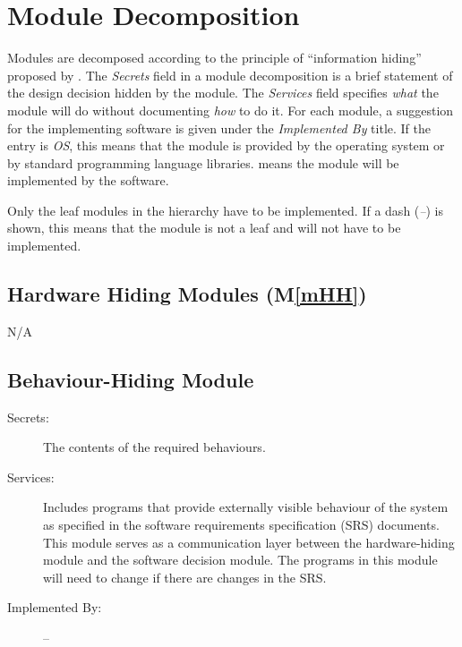 \documentclass[12pt, titlepage]{article}
\newcommand{\mref}[1]{M\ref{#1}}
\begin{document}
\section{Module Decomposition} \label{SecMD}

Modules are decomposed according to the principle of ``information hiding''
proposed by \citet{ParnasEtAl1984}. The \emph{Secrets} field in a module
decomposition is a brief statement of the design decision hidden by the
module. The \emph{Services} field specifies \emph{what} the module will do
without documenting \emph{how} to do it. For each module, a suggestion for the
implementing software is given under the \emph{Implemented By} title. If the
entry is \emph{OS}, this means that the module is provided by the operating
system or by standard programming language libraries.  \emph{\progname{}} means the
module will be implemented by the \progname{} software.

Only the leaf modules in the hierarchy have to be implemented. If a dash
(\emph{--}) is shown, this means that the module is not a leaf and will not have
to be implemented.

\subsection{Hardware Hiding Modules (\mref{mHH})}

\begin{description}
\item N/A
\end{description}

\subsection{Behaviour-Hiding Module}


 
\begin{description}
\item[Secrets:]The contents of the required behaviours.
\item[Services:]Includes programs that provide externally visible behaviour of
  the system as specified in the software requirements specification (SRS)
  documents. This module serves as a communication layer between the
  hardware-hiding module and the software decision module. The programs in this
  module will need to change if there are changes in the SRS.
\item[Implemented By:] --
\end{description}
\end{document}
